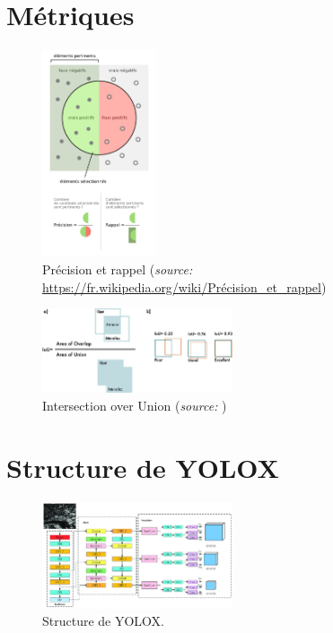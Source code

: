 \chapter{Métriques}

\begin{figure}[h]
    \centering
    \includegraphics[width=0.3\textwidth]{./img/precision_recall.png}
    \caption{Précision et rappel (\textit{source:} \url{https://fr.wikipedia.org/wiki/Précision_et_rappel})}
    \label{precision_recall}
\end{figure}

\begin{figure}[h]
    \centering
    \includegraphics[width=0.5\textwidth]{./img/iou.png}
    \caption{Intersection over Union (\textit{source:}
    \cite{Terven_Cordova-Esparza_Ramirez-Pedraza_Chavez-Urbiola_2023})}
    \label{iou}
\end{figure}

\pagebreak

\chapter{Structure de YOLOX}


\begin{figure}[h]
    \centering
    \includegraphics[width=0.5\textwidth]{./img/The-network-structure-of-YOLOX.png}
    \caption{Structure de YOLOX.}
    \label{yolox_structure}
\end{figure}


